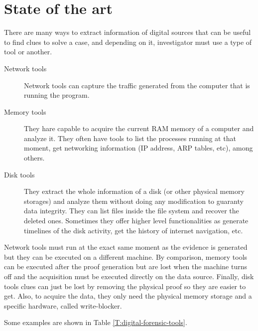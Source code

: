 \chapter{State of the art}
\label{S:state-of-the-art}

There are many ways to extract information of digital sources that can be
useful to find clues to solve a case, and depending on it, investigator must use
a type of tool or another.

\begin{description}
	\item[Network tools] Network tools can capture the traffic generated from 
	the computer that is running the program.

	\item[Memory tools] They hare capable to acquire the current RAM memory of
	a computer and analyze it. They often have tools to list the processes
	running at that moment, get networking information (IP address, ARP tables,
	etc), among others.

	\item[Disk tools] They extract the whole information of a disk (or other
	physical memory storages) and analyze them without doing any modification
	to guaranty data integrity. They can list files inside the file system and
	recover the deleted ones. Sometimes they offer higher level functionalities 
	as generate timelines of the disk activity, get the history of internet
	navigation, etc.
\end{description}

Network tools must run at the exact same moment as the evidence is generated
but they can be executed on a different machine. By comparison, memory tools can
be executed after the proof generation but are lost when the machine turns off
and the acquisition must be executed directly on the data source. Finally, disk
tools clues can just be lost by removing the physical proof so they are easier 
to get. Also, to acquire the data, they only need the physical memory storage
and a specific hardware, called write-blocker.

Some examples are shown in Table \ref{T:digital-forensic-tools}.

